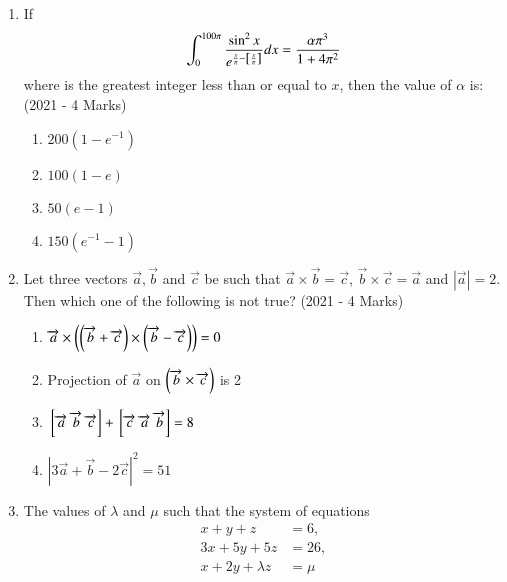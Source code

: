 \documentclass[journal]{IEEEtran}
\begin{document}
\begin{enumerate}
{\begin{multicols}{4}
\begin{enumerate}
\item -38
\end{enumerate}
\end{multicols}
}
\item{
If  $$\int_0^{100\pi} \frac{\sin^2 x}{e^{\frac{x}{\pi} - {}\left[\frac{x}{\pi}\right]}} dx = \frac{\alpha \pi^3}{1+ 4\pi^2}$$
where  is the greatest integer less than or equal to $x$, then the value of $\alpha$ is:
\\ 
\hfill
{(2021 - 4 Marks)}
\begin{multicols}{4}
\begin{enumerate}
\item $200(1 - e ^{-1})$
\item $100(1 - e)$
\item $50(e - 1)$
\item $150(e^{-1} - 1)$
\end{enumerate}
\end{multicols}
}
\item{
Let three vectors $\overrightarrow{a},\overrightarrow{b}$ and $\overrightarrow{c}$ be such that $\overrightarrow{a} \times \overrightarrow{b} = \overrightarrow{c}$, $\overrightarrow{b} \times \overrightarrow{c} =\overrightarrow{a}$ and $|\overrightarrow{a}| = 2$. Then which one of the following is not true?
\hfill
{(2021 - 4 Marks)}
\begin{multicols}{2}
\begin{enumerate}
\item $\overrightarrow{a}\times\left(\left(\overrightarrow{b}+\overrightarrow{c}\right)\times\left(\overrightarrow{b}-\overrightarrow{c}\right)\right) = 0$
\item Projection of $\overrightarrow{a}$ on $\left(\overrightarrow{b}\times\overrightarrow{c}\right)$ is 2
\item ${}\left[\overrightarrow{a}\text{ }\overrightarrow{b}\text{ }\overrightarrow{c}\right]+{}\left[\overrightarrow{c}\text{ }\overrightarrow{a}\text{ }\overrightarrow{b}\right] =8$
\item $|3\overrightarrow{a}+\overrightarrow{b}  -2\overrightarrow{c}|^2 = 51$
\end{enumerate}
\end{multicols}
}
\item{
The values of $\lambda$ and $\mu$ such that the system of equations 
\begin{align*}
x+y+z &= 6, \\
3x+5y+5z &= 26, \\
x + 2y + \lambda z &= \mu
\end{align*}
}
\end{enumerate}
\end{document}
